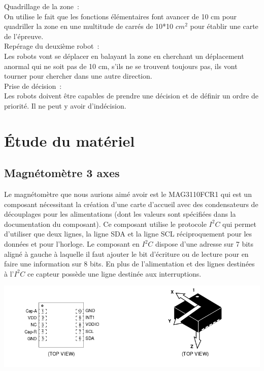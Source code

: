 \documentclass{article}
\begin{document}
Quadrillage de la zone~:\\

On utilise le fait que les fonctions élémentaires font avancer de 10 cm pour quadriller la zone en une multitude de carrés de 10*10 $cm^2$ pour établir une carte de l’épreuve. \\

Repérage du deuxième robot~: \\

Les robots vont se déplacer en balayant la zone en cherchant un déplacement anormal qui ne soit pas de 10 cm, s’ils ne se trouvent toujours pas, ils vont tourner pour chercher dans une autre direction. \\

Prise de décision~: \\

Les robots doivent être capables de prendre une décision et de définir un ordre de priorité. Il ne peut y avoir d'indécision.

\section{Étude du matériel}

\subsection{Magnétomètre 3 axes}

Le magnétomètre que nous aurions aimé avoir est le MAG3110FCR1 qui est un composant nécessitant la création d'une carte d’accueil avec des condensateurs de découplages pour les alimentations (dont les valeurs sont spécifiées dans la documentation du composant). Ce composant utilise le protocole $I^2C$ qui permet d'utiliser que deux lignes, la ligne SDA et la ligne SCL réciproquement pour les données et pour l'horloge. Le composant en $I^2C$ dispose d'une adresse sur 7 bits aligné à gauche à laquelle il faut ajouter le bit d'écriture ou de lecture pour en faire une information sur 8 bits. En plus de l'alimentation et des lignes destinées à l'$I^2C$ ce capteur possède une ligne destinée aux interruptions.

\begin{center}
  \includegraphics[width=17cm]{mag_schematic.png}
\end{center}
\end{document}
